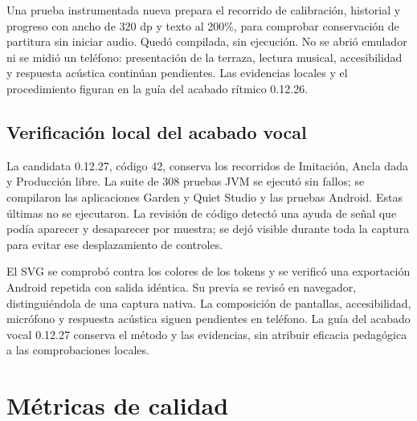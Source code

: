 Una prueba instrumentada nueva prepara el recorrido de calibración, historial
y progreso con ancho de 320 dp y texto al 200\%, para comprobar conservación
de partitura sin iniciar audio. Quedó compilada, sin ejecución. No se abrió
emulador ni se midió un teléfono: presentación de la terraza, lectura musical,
accesibilidad y respuesta acústica continúan pendientes. Las evidencias locales
y el procedimiento figuran en la guía del acabado rítmico 0.12.26.

\subsection{Verificación local del acabado vocal}
La candidata 0.12.27, código 42, conserva los recorridos de Imitación, Ancla
dada y Producción libre. La suite de 308 pruebas JVM se ejecutó sin fallos;
se compilaron las aplicaciones Garden y Quiet Studio y las pruebas Android.
Estas últimas no se ejecutaron. La revisión de código detectó una ayuda de
señal que podía aparecer y desaparecer por muestra; se dejó visible durante
toda la captura para evitar ese desplazamiento de controles.

El SVG se comprobó contra los colores de los tokens y se verificó una
exportación Android repetida con salida idéntica. Su previa se revisó en
navegador, distinguiéndola de una captura nativa. La composición de pantallas,
accesibilidad, micrófono y respuesta acústica siguen pendientes en teléfono.
La guía del acabado vocal 0.12.27 conserva el método y las evidencias, sin
atribuir eficacia pedagógica a las comprobaciones locales.

\section{Métricas de calidad}
